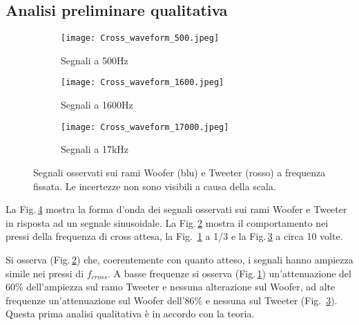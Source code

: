 \documentclass[../Relazione_circuiti]{subfiles}
\begin{document}
\subsection{Analisi preliminare qualitativa}

  \begin{figure}[H]
    \centering

    \begin{subfigure}[b]{0.3\textwidth}
      \centering
      \texttt{[image: Cross\_waveform\_500.jpeg]}

      \caption{Segnali a 500Hz}
      \label{fig:signal_500}

    \end{subfigure}
    \hfill
    \begin{subfigure}[b]{0.3\textwidth}
      \centering
      \texttt{[image: Cross\_waveform\_1600.jpeg]}

      \caption{Segnali a 1600Hz}
      \label{fig:signal_1600}

    \end{subfigure}
    \hfill
    \begin{subfigure}[b]{0.3\textwidth}
      \centering
      \texttt{[image: Cross\_waveform\_17000.jpeg]}

      \caption{Segnali a 17kHz}
      \label{fig:signal_17k}

    \end{subfigure}
    \hfill

    \caption{Segnali osservati sui rami Woofer (blu) e Tweeter (rosso)
      a frequenza fissata. Le incertezze non sono visibili a causa della scala.}

    \label{fig:signal_waveforms}

  \end{figure}


  La Fig.\,\ref{fig:signal_waveforms} mostra la forma d'onda dei segnali osservati sui rami Woofer e Tweeter in risposta
  ad un segnale sinusoidale.
  La Fig.\,\ref{fig:signal_1600} mostra il comportamento nei pressi della frequenza di cross attesa, la Fig.
 \,\ref{fig:signal_500} a 1/3 e la Fig.\,\ref{fig:signal_17k} a circa 10 volte.

  Si osserva (Fig.\,\ref{fig:signal_1600}) che, coerentemente con quanto atteso, i segnali hanno ampiezza simile nei
  pressi di $f_{cross}$.
  A basse frequenze si osserva (Fig.\,\ref{fig:signal_500}) un'attenuazione del 60\% dell'ampiezza sul ramo Tweeter e
  nessuna alterazione sul Woofer, ad alte frequenze un'attenuazione sul Woofer dell'86\% e nessuna sul Tweeter (Fig.
 \,\ref{fig:signal_17k}). Questa prima analisi qualitativa è in accordo con la teoria.
\end{document}
